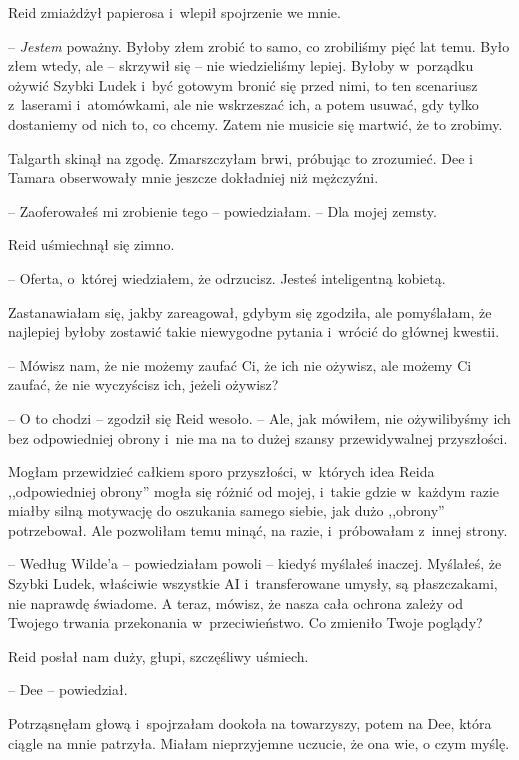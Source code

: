\documentclass[oneside,polish,11pt,sfheadings]{mwbk}
\begin{document}
Reid zmiażdżył papierosa i~wlepił spojrzenie we mnie.

-- \textit{Jestem} poważny. Byłoby złem zrobić to samo, co zrobiliśmy pięć
lat temu. Było złem wtedy, ale -- skrzywił się -- nie wiedzieliśmy lepiej.
Byłoby w~porządku ożywić Szybki Ludek i~być gotowym bronić się przed
nimi, to ten scenariusz z~laserami i~atomówkami, ale nie wskrzeszać ich,
a potem usuwać, gdy tylko dostaniemy od nich to, co chcemy. Zatem nie
musicie się martwić, że to zrobimy.

Talgarth skinął na zgodę. Zmarszczyłam brwi, próbując to zrozumieć. Dee
i Tamara obserwowały mnie jeszcze dokładniej niż mężczyźni.

-- Zaoferowałeś mi zrobienie tego -- powiedziałam. -- Dla mojej zemsty.

Reid uśmiechnął się zimno. 

-- Oferta, o~której wiedziałem, że odrzucisz.
Jesteś inteligentną kobietą.

Zastanawiałam się, jakby zareagował, gdybym się zgodziła, ale
pomyślałam, że najlepiej byłoby zostawić takie niewygodne pytania i~wrócić do głównej kwestii.

-- Mówisz nam, że nie możemy zaufać Ci, że ich nie ożywisz, ale możemy Ci
zaufać, że nie wyczyścisz ich, jeżeli ożywisz?

-- O to chodzi -- zgodził się Reid wesoło. -- Ale, jak mówiłem, nie
ożywilibyśmy ich bez odpowiedniej obrony i~nie ma na to dużej szansy
przewidywalnej przyszłości.

Mogłam przewidzieć całkiem sporo przyszłości, w~których idea Reida
,,odpowiedniej obrony'' mogła się różnić od mojej, i~takie gdzie w~każdym razie miałby silną motywację do oszukania samego siebie, jak dużo
,,obrony'' potrzebował. Ale pozwoliłam temu minąć, na razie, i~próbowałam z~innej strony.

-- Według Wilde'a -- powiedziałam powoli -- kiedyś myślałeś inaczej.
Myślałeś, że Szybki Ludek, właściwie wszystkie AI i~transferowane
umysły, są płaszczakami, nie naprawdę świadome. A teraz, mówisz, że
nasza cała ochrona zależy od Twojego trwania przekonania w~przeciwieństwo. Co zmieniło Twoje poglądy?

Reid posłał nam duży, głupi, szczęśliwy uśmiech. 

-- Dee -- powiedział.

Potrząsnęłam głową i~spojrzałam dookoła na towarzyszy, potem na Dee,
która ciągle na mnie patrzyła. Miałam nieprzyjemne uczucie, że ona wie,
o czym myślę.
\end{document}
